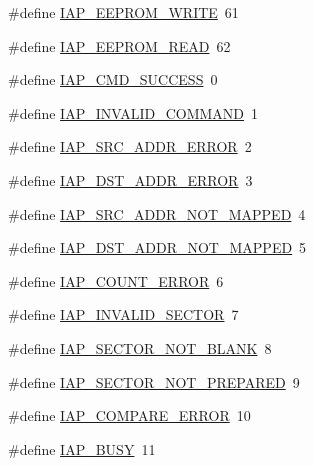 \begin{DoxyCompactItemize}
\item 
\#define \hyperlink{group___c_o_m_m_o_n___i_a_p_ga76ebaaa7cd2a015246d1a44e3a0cc369}{I\+A\+P\+\_\+\+E\+E\+P\+R\+O\+M\+\_\+\+W\+R\+I\+TE}~61
\item 
\#define \hyperlink{group___c_o_m_m_o_n___i_a_p_ga34d721b0a3ff4caf7b847c9d85fe73a0}{I\+A\+P\+\_\+\+E\+E\+P\+R\+O\+M\+\_\+\+R\+E\+AD}~62
\item 
\#define \hyperlink{group___c_o_m_m_o_n___i_a_p_ga6855b3bb97689d746eff1f27dde58fc5}{I\+A\+P\+\_\+\+C\+M\+D\+\_\+\+S\+U\+C\+C\+E\+SS}~0
\item 
\#define \hyperlink{group___c_o_m_m_o_n___i_a_p_ga78fcc8d4b3835576a272431915e39eb7}{I\+A\+P\+\_\+\+I\+N\+V\+A\+L\+I\+D\+\_\+\+C\+O\+M\+M\+A\+ND}~1
\item 
\#define \hyperlink{group___c_o_m_m_o_n___i_a_p_gaad19f900fbc28ee51d3e0138a88a446b}{I\+A\+P\+\_\+\+S\+R\+C\+\_\+\+A\+D\+D\+R\+\_\+\+E\+R\+R\+OR}~2
\item 
\#define \hyperlink{group___c_o_m_m_o_n___i_a_p_ga72a13c4c7132aa3da476fc0907cb2a08}{I\+A\+P\+\_\+\+D\+S\+T\+\_\+\+A\+D\+D\+R\+\_\+\+E\+R\+R\+OR}~3
\item 
\#define \hyperlink{group___c_o_m_m_o_n___i_a_p_ga8d15cbc501933748afbe786c587e74f9}{I\+A\+P\+\_\+\+S\+R\+C\+\_\+\+A\+D\+D\+R\+\_\+\+N\+O\+T\+\_\+\+M\+A\+P\+P\+ED}~4
\item 
\#define \hyperlink{group___c_o_m_m_o_n___i_a_p_gacd5a7fb6c783f5d435e594170757d1d4}{I\+A\+P\+\_\+\+D\+S\+T\+\_\+\+A\+D\+D\+R\+\_\+\+N\+O\+T\+\_\+\+M\+A\+P\+P\+ED}~5
\item 
\#define \hyperlink{group___c_o_m_m_o_n___i_a_p_ga719488ff2abf2f325b73a10b20403813}{I\+A\+P\+\_\+\+C\+O\+U\+N\+T\+\_\+\+E\+R\+R\+OR}~6
\item 
\#define \hyperlink{group___c_o_m_m_o_n___i_a_p_gab3af925b968fb59823d08d77261aebf7}{I\+A\+P\+\_\+\+I\+N\+V\+A\+L\+I\+D\+\_\+\+S\+E\+C\+T\+OR}~7
\item 
\#define \hyperlink{group___c_o_m_m_o_n___i_a_p_ga19b046ec9c03aa0276a9cbe409eb3f04}{I\+A\+P\+\_\+\+S\+E\+C\+T\+O\+R\+\_\+\+N\+O\+T\+\_\+\+B\+L\+A\+NK}~8
\item 
\#define \hyperlink{group___c_o_m_m_o_n___i_a_p_ga8600f9e930f1dee5d67a2bc11efcde63}{I\+A\+P\+\_\+\+S\+E\+C\+T\+O\+R\+\_\+\+N\+O\+T\+\_\+\+P\+R\+E\+P\+A\+R\+ED}~9
\item 
\#define \hyperlink{group___c_o_m_m_o_n___i_a_p_gabeb57ce3d4009fdee1847f5494376c8d}{I\+A\+P\+\_\+\+C\+O\+M\+P\+A\+R\+E\+\_\+\+E\+R\+R\+OR}~10
\item 
\#define \hyperlink{group___c_o_m_m_o_n___i_a_p_gaa4e308bc310bb68aa8409a6f830aee04}{I\+A\+P\+\_\+\+B\+U\+SY}~11

\end{DoxyCompactItemize}
